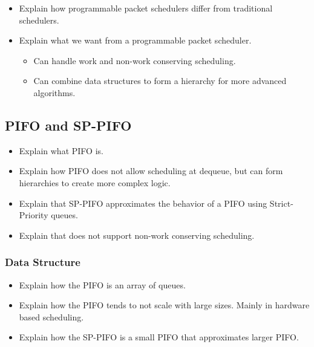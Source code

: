 \documentclass[sigconf, nonacm]{acmart}
\begin{document}

\begin{itemize}
  \item Explain how programmable packet schedulers differ from traditional schedulers.
  \item Explain what we want from a programmable packet scheduler.
        \begin{itemize}
          \item Can handle work and non-work conserving scheduling.
          \item Can combine data structures to form a hierarchy for more advanced algorithms.
        \end{itemize}
\end{itemize}



\subsection{PIFO and SP-PIFO}

\begin{itemize}
  \item Explain what PIFO\cite{Sivaraman2016} is.
  \item Explain how PIFO does not allow scheduling at dequeue, but can form hierarchies to create more complex logic.
  \item Explain that SP-PIFO\cite{Alcoz2020} approximates the behavior of a PIFO using Strict-Priority queues.
  \item Explain that does not support non-work conserving scheduling.
\end{itemize}


\subsubsection{Data Structure}

\begin{itemize}
  \item Explain how the PIFO is an array of queues.
  \item Explain how the PIFO tends to not scale with large sizes. Mainly in hardware based scheduling.
  \item Explain how the SP-PIFO is a small PIFO that approximates larger PIFO.
\end{itemize}
\end{document}
